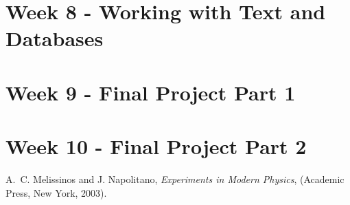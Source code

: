 \documentclass[letterpaper,12pt]{article}
\begin{document}
\section{Week 8 - Working with Text and Databases
}


\section{Week 9 - Final Project Part 1
}

\section{Week 10 - Final Project Part 2
}

\begin{thebibliography}{99}

A.~C. Melissinos and J. Napolitano, \textit{Experiments in Modern Physics},
(Academic Press, New York, 2003).


\end{thebibliography}
\end{document}
